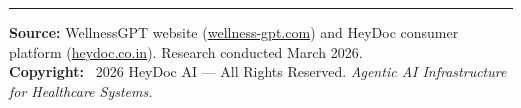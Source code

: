 \documentclass[12pt,a4paper]{article}
\begin{document}
\vspace{1cm}

\hrule
\vspace{0.3cm}
\small
\textbf{Source:} WellnessGPT website (\href{https://wellness-gpt.com}{wellness-gpt.com}) and HeyDoc consumer platform (\href{https://heydoc.co.in}{heydoc.co.in}). Research conducted March 2026.\\
\textbf{Copyright:} \textcopyright~2026 HeyDoc AI --- All Rights Reserved. \textit{Agentic AI Infrastructure for Healthcare Systems.}
\end{document}
